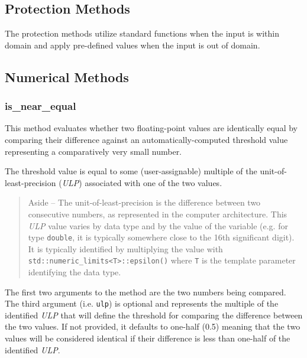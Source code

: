 \documentclass[11pt,fleqn]{report}
\begin{document}
\subsection{Protection Methods}

The protection methods utilize standard functions when the input is
within domain and apply pre-defined values when the input is out of domain.

\subsection{Numerical Methods}

\subsubsection{is\_near\_equal}

This method evaluates whether two floating-point
values are identically equal by comparing their difference against an
automatically-computed threshold value representing a comparatively very small
number.

The threshold value is equal to some (user-assignable) multiple of the
unit-of-least-precision (\textit{ULP}) associated with one of the two
values.

\begin{quote}
Aside -- The unit-of-least-precision is the difference between two consecutive
numbers, as represented in the computer architecture. This \textit{ULP}
value varies by data type and by the value of the variable (e.g. for type
\texttt{double}, it is typically somewhere close to the 16th significant
digit). It is typically identified by multiplying the value with
\texttt{std::numeric\_limits<T>::epsilon()} where \texttt{T} is the template
parameter identifying the data type.
\end{quote}

The first two arguments to the method are the two numbers being compared.
The third argument (i.e. \texttt{ulp}) is optional and represents
the multiple of the identified \textit{ULP} that will define the threshold
for comparing the difference between the two values. If not provided, it
defaults to one-half (0.5) meaning that the two values will be considered
identical if their difference is less than one-half of the identified
\textit{ULP}.
\end{document}
